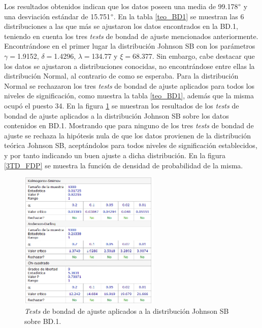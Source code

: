 \documentclass[12pt]{report}
\begin{document}
	 Los resultados obtenidos indican que los datos poseen una media de 99.178$\degree$ y una desviación estándar de 15.751$\degree$.
	 En la tabla \ref{teo_BD1}  se muestran las 6 distribuciones a las que más se ajustaron los datos encontrados en la BD.1, teniendo en cuenta los tres \textit{tests} de bondad de ajuste mencionados anteriormente. Encontrándose en el primer lugar la distribución Johnson SB con los parámetros $\gamma=$1.9152, $\delta=$1.4296, $\lambda=$134.77 y $\xi=$68.377.  Sin embargo, cabe destacar que los datos se ajustaron a  distribuciones conocidas, no encontrándose entre ellas la distribución Normal, al contrario de como se esperaba. Para la distribución Normal se rechazaron los tres \textit{tests} de bondad de ajuste aplicados para todos los niveles de significación, como muestra la tabla \ref{teo_BD1}, además que la misma ocupó el puesto 34. En la figura \ref{3TD_BONDAD} se  muestran los resultados de los \textit{tests} de bondad de ajuste aplicados a la distribución Johnson SB sobre los datos contenidos en BD.1. Mostrando que para ninguno de los tres \textit{tests} de bondad de ajuste  se rechaza la hipótesis nula de que los datos provienen de la distribución teórica Johnson SB, aceptándolos para todos niveles de significación establecidos, y por tanto indicando un buen ajuste a dicha distribución. En la figura \ref{3TD_FDP}  se muestra la función de densidad de probabilidad de la misma.
	  	\begin{figure}[ht]
	  	\centering
	  	
 	  	\includegraphics[width=0.6\textwidth]{3td_BONDAD.png}
	  	\caption{\textit{Tests} de bondad de ajuste aplicados a la distribución Johnson SB sobre BD.1.}
	  	\label{3TD_BONDAD}
	  \end{figure}
	  
	  
	 
\end{document}
